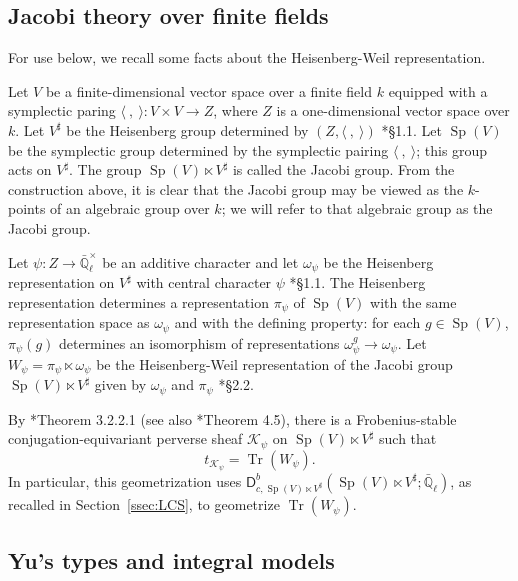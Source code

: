 \documentclass[10pt]{amsart}
\theoremstyle{plain}
\theoremstyle{definition}
\newcommand{\EE}{\mathbb{\bar Q}_\ell}
\newcommand{\Fq}{k}
\newcommand{\EEx}{\EE^\times}
\DeclareMathOperator{\trace}{Tr}
\newcommand{\trFrob}[1]{t_{#1}}
\newcommand{\cs}[1]{{\mathcal{#1}}}
\newcommand{\Sp}{{\operatorname{Sp}}}
\begin{document}
\subsection{Jacobi theory over finite fields}\label{ssec:Jacobi}

For use below, we recall some facts about the Heisenberg-Weil representation.

Let $V$ be a finite-dimensional vector space over a finite field $\Fq$ equipped with a symplectic paring $\langle\ ,\ \rangle : V\times V \to Z$, where $Z$ is a one-dimensional vector space over $\Fq$.
Let $V^\sharp$ be the Heisenberg group determined by $(Z, \langle\ ,\ \rangle)$ \cite{gurevich-hadani:07a}*{\S 1.1}.
Let $\Sp(V)$ be the symplectic group determined by the symplectic pairing $\langle\ ,\ \rangle$; this group acts on $V^\sharp$.
The group $\Sp(V)\ltimes V^\sharp$ is called the Jacobi group. 
From the construction above, it is clear that the Jacobi group may be viewed as the $\Fq$-points of an algebraic group over $\Fq$; we will refer to that algebraic group as the Jacobi group.

Let $\psi : Z \to \EEx$ be an additive character and let $\omega_\psi$ be the Heisenberg representation on $V^\sharp$ with central character $\psi$ \cite{gurevich-hadani:07a}*{\S 1.1}. 
The Heisenberg representation determines a representation $\pi_{\psi}$ of $\Sp(V)$ with the same representation space as $\omega_\psi$ and with the defining property: for each $g\in \Sp(V)$, $\pi_\psi(g)$ determines an isomorphism of representations $\omega_\psi^g \to \omega_\psi$.
Let $W_\psi = \pi_\psi \ltimes \omega_\psi$ be the Heisenberg-Weil representation of the Jacobi group $\Sp(V)\ltimes V^\sharp$ given by $\omega_\psi$ and $\pi_\psi$ \cite{gurevich-hadani:07a}*{\S 2.2}.

By \cite{gurevich-hadani:07a}*{Theorem 3.2.2.1} (see also \cite{gurevich-hadani:11a}*{Theorem 4.5}), there is a Frobenius-stable conjugation-equivariant perverse sheaf $\cs{K}_\psi$ on $\Sp(V)\ltimes V^\sharp$  such that 
\begin{equation}\label{eqn:Jacobi}
\trFrob{\cs{K}_\psi} = \trace(W_\psi).
\end{equation}
%
In particular, this geometrization uses $\mathsf{D}^b_{c,\Sp(V)\ltimes V^\sharp}(\Sp(V)\ltimes V^\sharp;\EE)$, as recalled in Section~\ref{ssec:LCS}, to geometrize $\trace(W_\psi)$. 

\subsection{Yu's types and integral models}\label{ssec:review}
\end{document}
